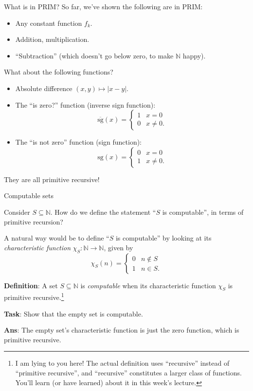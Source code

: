 \documentclass{beamer}
\newcommand{\N}{\mathbb N}
\begin{document}
\begin{frame}{What is in PRIM?}
So far, we've shown the following are in PRIM:
\begin{itemize}
    \item Any constant function $f_k$.
    \item Addition, multiplication.
    \item ``Subtraction'' (which doesn't go below zero, to make $\N$ happy).
\end{itemize}
\pause
What about the following functions?
\begin{itemize}
    \item Absolute difference $(x, y) \mapsto |x - y|$. \pause
    \item The ``is zero?'' function (inverse sign function): $$\overline{\mathrm{sg}}(x) = \begin{cases}
    1 & x = 0\\
    0 & x \neq 0.
    \end{cases}$$\pause
    \item The ``is not zero'' function (sign function): 
    $$\mathrm{sg}(x) = \begin{cases}
    0 & x = 0\\
    1 & x \neq 0.
    \end{cases}$$\pause
\end{itemize}
They are all primitive recursive!

\end{frame}

\begin{frame}{Computable sets}

Consider $S \subseteq \N$. How do we define the statement ``$S$ is computable'', in terms of primitive recursion?

\pause
A natural way would be to define ``$S$ is computable'' by looking at its \textit{characteristic function} $\chi_S: \N \to \N$, given by
$$\chi_S(n) = \begin{cases}
0 & n \notin S\\
1 & n \in S.
\end{cases}$$

\textbf{Definition}: A set $S \subseteq \N$ is \textit{computable} when its characteristic function $\chi_S$ is primitive recursive.\footnote{I am lying to you here! The actual definition uses ``recursive'' instead of ``primitive recursive'', and ``recursive'' constitutes a larger class of functions. You'll learn (or have learned) about it in this week's lecture.}

\textbf{Task}: Show that the empty set is computable. \pause

\textbf{Ans}: The empty set's characteristic function is just the zero function, which is primitive recursive.
    
\end{frame}
\end{document}

